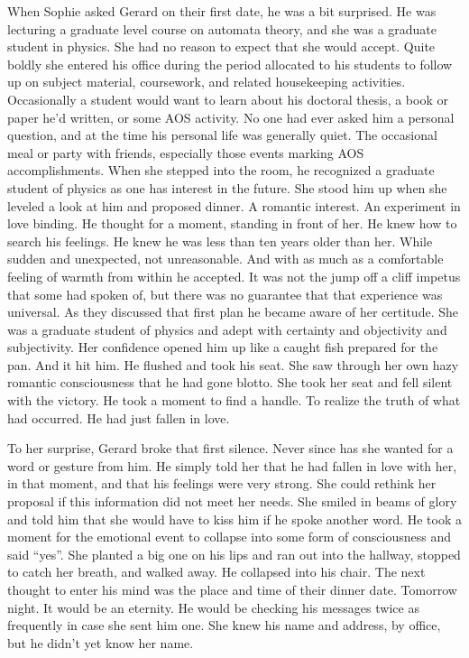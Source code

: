 When Sophie asked Gerard on their first date, he was a bit surprised.
He was lecturing a graduate level course on automata theory, and she
was a graduate student in physics.  She had no reason to expect that
she would accept.  Quite boldly she entered his office during the
period allocated to his students to follow up on subject material,
coursework, and related housekeeping activities.  Occasionally a
student would want to learn about his doctoral thesis, a book or paper
he'd written, or some AOS activity.  No one had ever asked him a
personal question, and at the time his personal life was generally
quiet.  The occasional meal or party with friends, especially those
events marking AOS accomplishments.  When she stepped into the room,
he recognized a graduate student of physics as one has interest in the
future.  She stood him up when she leveled a look at him and proposed
dinner.  A romantic interest.  An experiment in love binding.  He
thought for a moment, standing in front of her.  He knew how to search
his feelings.  He knew he was less than ten years older than her.
While sudden and unexpected, not unreasonable.  And with as much as a
comfortable feeling of warmth from within he accepted.  It was not the
jump off a cliff impetus that some had spoken of, but there was no
guarantee that that experience was universal.  As they discussed that
first plan he became aware of her certitude.  She was a graduate
student of physics and adept with certainty and objectivity and
subjectivity.  Her confidence opened him up like a caught fish
prepared for the pan.  And it hit him.  He flushed and took his seat.
She saw through her own hazy romantic consciousness that he had gone
blotto.  She took her seat and fell silent with the victory.  He took
a moment to find a handle.  To realize the truth of what had occurred.
He had just fallen in love.



To her surprise, Gerard broke that first silence.  Never since has she
wanted for a word or gesture from him.  He simply told her that he had
fallen in love with her, in that moment, and that his feelings were
very strong.  She could rethink her proposal if this information did
not meet her needs.  She smiled in beams of glory and told him that
she would have to kiss him if he spoke another word.  He took a moment
for the emotional event to collapse into some form of consciousness
and said ``yes''.  She planted a big one on his lips and ran out into
the hallway, stopped to catch her breath, and walked away.  He
collapsed into his chair.  The next thought to enter his mind was the
place and time of their dinner date.  Tomorrow night.  It would be an
eternity.  He would be checking his messages twice as frequently in
case she sent him one.  She knew his name and address, by office, but
he didn't yet know her name.



